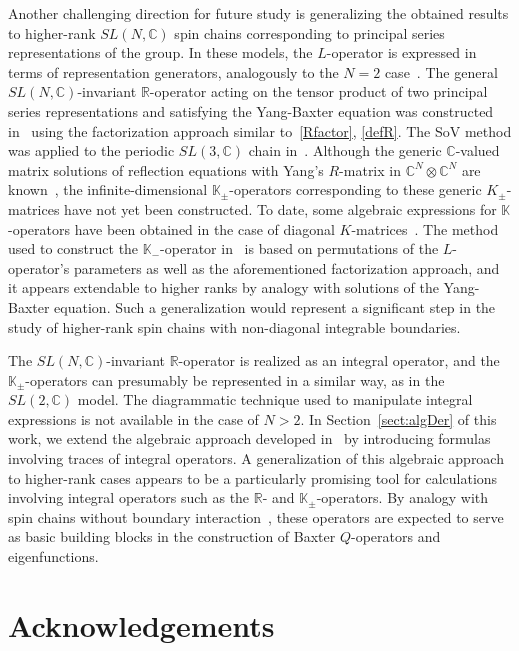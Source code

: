 \documentclass[a4paper,11pt]{article}
\numberwithin{equation}{section}
\begin{document}
Another challenging direction for future study is generalizing the obtained results to higher-rank $SL(N,\mathbb{C})$ spin chains corresponding to principal series representations of the group.
In these models, the $L$-operator is expressed in terms of representation generators, analogously to the $N=2$ case~\cite{DM06}.
The general $SL(N,\mathbb{C})$-invariant $\mathbb{R}$-operator acting on the tensor product of two principal series representations 
and satisfying the Yang-Baxter equation was constructed in~\cite{DM06,DM09} using the factorization approach similar to~\eqref{Rfactor}, \eqref{defR}.
The SoV method was applied to the periodic $SL(3,\mathbb{C})$ chain in~\cite{DV19}.
Although the generic $\mathbb{C}$-valued matrix solutions of reflection equations with Yang's $R$-matrix in $\mathbb{C}^N\otimes\mathbb{C}^N$ are known~\cite{MNopen},
the infinite-dimensional $\mathbb{K}_\pm$-operators corresponding to these generic $K_\pm$-matrices have not yet been constructed.
To date, some algebraic expressions for $\mathbb{K}$-operators have been obtained in the case of diagonal $K$-matrices~\cite{Frassek2026}.
The method used to construct the $\mathbb{K}_-$-operator in~\cite{ABDV}
is based on permutations of the $L$-operator's parameters as well as the aforementioned factorization approach, and it appears extendable to higher ranks by analogy with solutions of the Yang-Baxter equation.
Such a generalization would represent a significant step in the study of higher-rank spin chains with non-diagonal integrable boundaries.

The $SL(N,\mathbb{C})$-invariant $\mathbb{R}$-operator is realized as an integral operator, and the $\mathbb{K}_\pm$-operators can presumably be represented in a similar way, as in the $SL(2,\mathbb{C})$ model.
The diagrammatic technique used to manipulate integral expressions is not available in the case of $N > 2$.
In Section~\ref{sect:algDer} of this work, we extend the algebraic approach developed in~\cite{ADV2,ADV1} by introducing formulas involving traces of integral operators. 
A generalization of this algebraic approach to higher-rank cases appears to be a particularly promising tool for calculations involving integral operators such as the $\mathbb{R}$- and $\mathbb{K}_\pm$-operators. By analogy with spin chains without boundary interaction~\cite{DM06,VDK16}, these operators are expected to serve as basic building blocks in the construction of Baxter $Q$-operators and eigenfunctions.


\section*{Acknowledgements}
\end{document}
